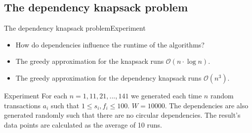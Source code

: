 \documentclass{beamer}
\begin{document}
\subsection* {The dependency knapsack problem}
\begin{frame}{The dependency knapsack problem}{Experiment } %
    \begin{itemize}
        \item {How do dependencies influence the runtime of the algorithms?}
        \item {The greedy approximation for the knapsack runs 
        $\mathcal{O}(n\cdot\log{n})$.}
        \item {The greedy approximation for the dependency knapsack runs 
        $\mathcal{O}(n^3)$.}
    \end{itemize}
    \begin{block}{Experiment }
    For each $n=1,11,21,...,141$ we generated each time $n$ random 
    transactions $a_i$ such that $1\leq s_i,f_i\leq 100$. $W=10000$. 
    The dependencies are also generated randomly such that there are no 
    circular dependencies. The result's data points are calculated as the average of 
    10 runs.
    \end{block}
\end{frame}
\end{document}
